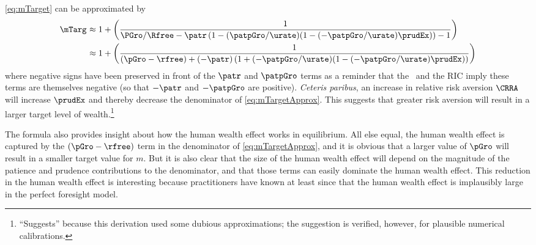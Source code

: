 \documentclass{\handout}
\begin{document}
\eqref{eq:mTarget} can be approximated by
\begin{equation}\begin{gathered}\begin{aligned}
 \mTarg^{\hideSup} & \approx  1 + \left(\frac{1}{\PGro/\Rfree-\patr \left(1-(\patpGro/\urate)(1-(-\patpGro/\urate)\prudEx) \right)-1}\right)
\\ & \approx  1 + \left(\frac{1}{(\pGro-\rfree)+(-\patr) \left(1+(-\patpGro/\urate)(1-(-\patpGro/\urate)\prudEx)\right)}\right)
\label{eq:mTargetApprox}
\end{aligned}\end{gathered}\end{equation}
where negative signs have been preserved in front of the $\patr$ and $\patpGro$ terms as a reminder that
the \GICPGro~and the RIC imply these terms are themselves negative (so that $-\patr$ and $-\patpGro$ are positive).
{\it Ceteris paribus}, an increase in relative risk aversion $\CRRA$ will increase $\prudEx$ and thereby decrease the denominator of \eqref{eq:mTargetApprox}.  This suggests that
greater risk aversion will result in a larger target level of wealth.\footnote{``Suggests'' because
this derivation used some dubious approximations; the suggestion is verified, however, for
plausible numerical calibrations.}


The formula also provides insight about how the human wealth effect
works in equilibrium.  All else equal, the human wealth effect is captured
by the $(\pGro-\rfree)$ term in the denominator of \eqref{eq:mTargetApprox},
and it is obvious that a larger value of $\pGro$ will result in a smaller
target value for $m$.  But it is also clear that the size of the human wealth
effect will depend on the magnitude of the patience and prudence contributions
to the denominator, and that those terms can easily dominate the human wealth
effect.  This reduction in the human wealth effect is interesting because practitioners have known at least since
\cite{summersCapTax} that the human wealth effect is implausibly large in the
perfect foresight model.
\end{document}
